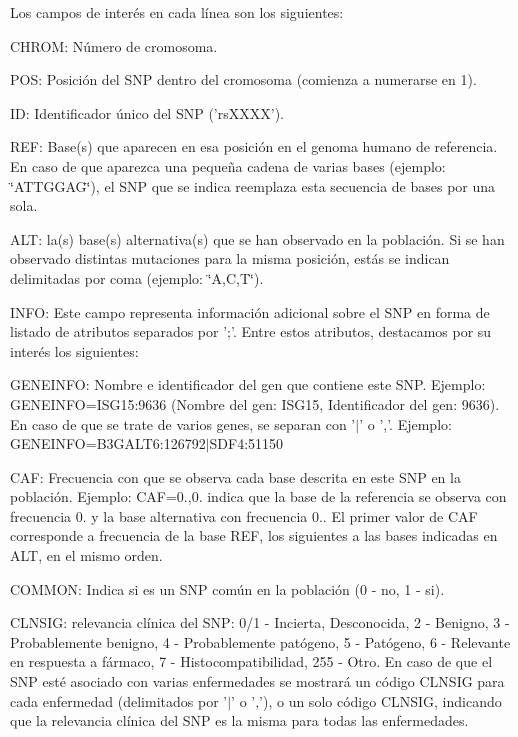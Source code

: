 Los campos de interés en cada línea son los siguientes\-: \begin{DoxyItemize}
\item C\-H\-R\-O\-M\-: Número de cromosoma. \item P\-O\-S\-: Posición del S\-N\-P dentro del cromosoma (comienza a numerarse en 1). \item I\-D\-: Identificador único del S\-N\-P ('rs\-X\-X\-X\-X'). \item R\-E\-F\-: Base(s) que aparecen en esa posición en el genoma humano de referencia. En caso de que aparezca una pequeña cadena de varias bases (ejemplo\-: \char`\"{}\-A\-T\-T\-G\-G\-A\-G\char`\"{}), el S\-N\-P que se indica reemplaza esta secuencia de bases por una sola. \item A\-L\-T\-: la(s) base(s) alternativa(s) que se han observado en la población. Si se han observado distintas mutaciones para la misma posición, estás se indican delimitadas por coma (ejemplo\-: \char`\"{}\-A,\-C,\-T\char`\"{}). \item I\-N\-F\-O\-: Este campo representa información adicional sobre el S\-N\-P en forma de listado de atributos separados por ';'. Entre estos atributos, destacamos por su interés los siguientes\-:
\begin{DoxyItemize}
\item G\-E\-N\-E\-I\-N\-F\-O\-: Nombre e identificador del gen que contiene este S\-N\-P. Ejemplo\-: G\-E\-N\-E\-I\-N\-F\-O=I\-S\-G15\-:9636 (Nombre del gen\-: I\-S\-G15, Identificador del gen\-: 9636). En caso de que se trate de varios genes, se separan con '$\vert$' o ','. Ejemplo\-: G\-E\-N\-E\-I\-N\-F\-O=B3\-G\-A\-L\-T6\-:126792$\vert$\-S\-D\-F4\-:51150
\item C\-A\-F\-: Frecuencia con que se observa cada base descrita en este S\-N\-P en la población. Ejemplo\-: C\-A\-F=0.,0. indica que la base de la referencia se observa con frecuencia 0. y la base alternativa con frecuencia 0.. El primer valor de C\-A\-F corresponde a frecuencia de la base R\-E\-F, los siguientes a las bases indicadas en A\-L\-T, en el mismo orden.
\item C\-O\-M\-M\-O\-N\-: Indica si es un S\-N\-P común en la población (0 -\/ no, 1 -\/ si).
\item C\-L\-N\-S\-I\-G\-: relevancia clínica del S\-N\-P\-: 0/1 -\/ Incierta, Desconocida, 2 -\/ Benigno, 3 -\/ Probablemente benigno, 4 -\/ Probablemente patógeno, 5 -\/ Patógeno, 6 -\/ Relevante en respuesta a fármaco, 7 -\/ Histocompatibilidad, 255 -\/ Otro. En caso de que el S\-N\-P esté asociado con varias enfermedades se mostrará un código C\-L\-N\-S\-I\-G para cada enfermedad (delimitados por '$\vert$' o ','), o un solo código C\-L\-N\-S\-I\-G, indicando que la relevancia clínica del S\-N\-P es la misma para todas las enfermedades.

\end{DoxyItemize}
\end{DoxyItemize}
